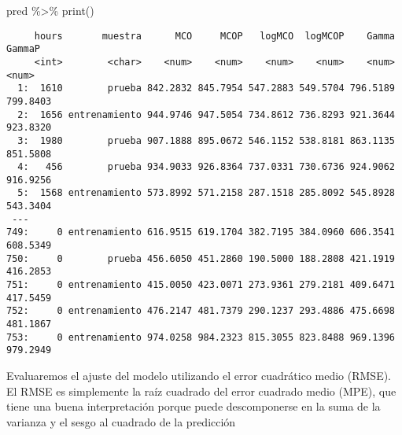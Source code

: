 \documentclass[
  letterpaper,
  DIV=11,
  numbers=noendperiod]{scrreprt}
\newenvironment{Shaded}{\begin{snugshade}}{\end{snugshade}}
\newcommand{\FunctionTok}[1]{\textcolor[rgb]{0.28,0.35,0.67}{#1}}
\newcommand{\NormalTok}[1]{\textcolor[rgb]{0.00,0.23,0.31}{#1}}
\newcommand{\SpecialCharTok}[1]{\textcolor[rgb]{0.37,0.37,0.37}{#1}}
\begin{document}
\begin{Shaded}
\begin{Highlighting}[]
\NormalTok{pred }\SpecialCharTok{\%\textgreater{}\%} 
  \FunctionTok{print}\NormalTok{()}
\end{Highlighting}
\end{Shaded}

\begin{verbatim}
     hours       muestra      MCO     MCOP   logMCO  logMCOP    Gamma   GammaP
     <int>        <char>    <num>    <num>    <num>    <num>    <num>    <num>
  1:  1610        prueba 842.2832 845.7954 547.2883 549.5704 796.5189 799.8403
  2:  1656 entrenamiento 944.9746 947.5054 734.8612 736.8293 921.3644 923.8320
  3:  1980        prueba 907.1888 895.0672 546.1152 538.8181 863.1135 851.5808
  4:   456        prueba 934.9033 926.8364 737.0331 730.6736 924.9062 916.9256
  5:  1568 entrenamiento 573.8992 571.2158 287.1518 285.8092 545.8928 543.3404
 ---                                                                          
749:     0 entrenamiento 616.9515 619.1704 382.7195 384.0960 606.3541 608.5349
750:     0        prueba 456.6050 451.2860 190.5000 188.2808 421.1919 416.2853
751:     0 entrenamiento 415.0050 423.0071 273.9361 279.2181 409.6471 417.5459
752:     0 entrenamiento 476.2147 481.7379 290.1237 293.4886 475.6698 481.1867
753:     0 entrenamiento 974.0258 984.2323 815.3055 823.8488 969.1396 979.2949
\end{verbatim}

Evaluaremos el ajuste del modelo utilizando el error cuadrático medio
(RMSE). El RMSE es simplemente la raíz cuadrado del error cuadrado medio
(MPE), que tiene una buena interpretación porque puede descomponerse en
la suma de la varianza y el sesgo al cuadrado de la predicción
\end{document}
